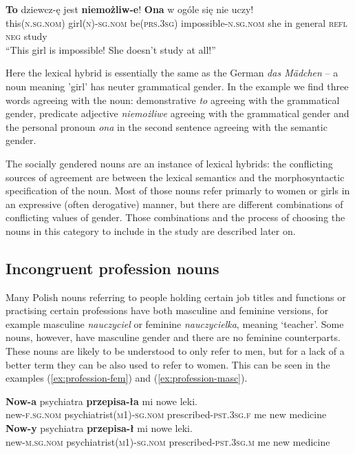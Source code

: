 \begin{exe}
  \ex\label{ex:gendered}
  \gll \textbf{To} dziewcz-ę jest \textbf{niemożliw-e}! \textbf{Ona} w ogóle się nie uczy!\\
  this\textsc{(n.sg.nom)} girl\textsc{(n)-sg.nom} be\textsc{(prs.3sg)} impossible\textsc{-n.sg.nom} she in general \textsc{refl} \textsc{neg} study\\
  \glt ``This girl is impossible! She doesn't study at all!''
\end{exe}

Here the lexical hybrid is essentially the same as the German \textsl{das M{\"a}dchen} -- a noun meaning 'girl' has neuter grammatical gender. In the example we find three words agreeing with the noun: demonstrative \textsl{to} agreeing with the grammatical gender, predicate adjective \textsl{niemożliwe} agreeing with the grammatical gender and the personal pronoun \textsl{ona} in the second sentence agreeing with the semantic gender.

The socially gendered nouns are an instance of lexical hybrids: the conflicting sources of agreement are between the lexical semantics and the morphosyntactic specification of the noun. Most of those nouns refer primarly to women or girls in an expressive (often derogative) manner, but there are different combinations of conflicting values of gender.
Those combinations and the process of choosing the nouns in this category to include in the study are described later on.

\subsection{Incongruent profession nouns}
Many Polish nouns referring to people holding certain job titles and functions or practising certain professions have both masculine and feminine versions, for example masculine \textsl{nauczyciel} or feminine \textsl{nauczycielka}, meaning `teacher'. Some nouns, however, have masculine gender and there are no feminine counterparts. These nouns are likely to be understood to only refer to men, but for a lack of a better term they can be also used to refer to women. This can be seen in the examples (\ref{ex:profession-fem}) and (\ref{ex:profession-masc}).

\begin{exe}
  \ex\label{ex:profession-fem}
  \gll \textbf{Now-a} psychiatra \textbf{przepisa-ła} mi nowe leki.\\
  new\textsc{-f.sg.nom} psychiatrist\textsc{(m1)-sg.nom} prescribed\textsc{-pst.3sg.f} me new medicine\\

  \ex\label{ex:profession-masc}
  \gll \textbf{Now-y} psychiatra \textbf{przepisa-ł} mi nowe leki.\\
  new\textsc{-m.sg.nom} psychiatrist\textsc{(m1)-sg.nom} prescribed\textsc{-pst.3sg.m} me new medicine\\
\end{exe}

